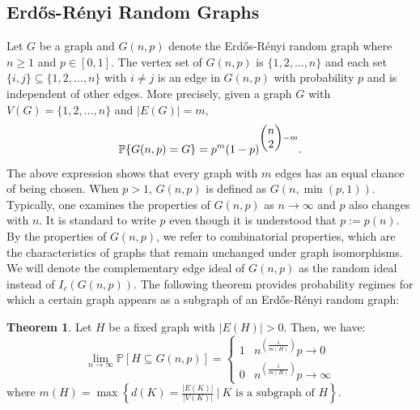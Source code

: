 \documentclass[oneside, 12pt]{amsart} \topmargin      -10mm \textwidth      160 true mm
\theoremstyle{definition}
\newtheorem{theorem'}{Theorem}[subsection]
\numberwithin{equation}{section}
\begin{document}
\subsection{Erd\H{o}s-Rényi Random Graphs}
Let $ G $ be a graph and $ G(n, p) $ denote the Erd\H{o}s-Rényi random graph where $ n\geq 1 $ and $ p\in [0, 1] $. The vertex set of $ G(n, p) $ is $ \{1,2,\dots , n\} $ and each set $ \{i, j\}\subseteq \{1,2,\dots,n\} $ with $ i\neq j $ is an edge in $ G(n, p) $ with probability $ p $ and is independent of other edges. More precisely, given a graph $ G $ with $V(G)= \{1,2,\dots,n\}$ and $|E(G)|= m $,
$$ \mathbb{P}\{G(n, p)=G\}=p^m(1-p)^{\begin{pmatrix}n\cr 2\end{pmatrix}-m}. $$
The above expression shows that every graph with $ m $ edges has an equal chance of being chosen. When $ p>1 $, $ G(n, p) $ is defined as $ G(n, \min(p, 1)) $. Typically, one examines the properties of $ G(n, p) $ as $ n \to \infty $ and $ p $ also changes with $ n $. It is standard to write $ p $ even though it is understood that $ p:=p(n) $. By the properties of $ G(n, p) $, we refer to combinatorial properties, which are the characteristics of graphs that remain unchanged under graph isomorphisms.  We will denote the complementary edge ideal  of $ G(n, p)$ as the random ideal instead of $I_c(G(n,p))$.
The following theorem provides probability regimes for which a  certain graph appears as a subgraph of an Erd\H{o}s-Rényi random graph:
\begin{theorem'}\cite[Theorem~5.3.]{frieze2015introduction}\label{prob}
  Let $H$ be a fixed graph with $|E(H)|>0$. Then, we have: $$\displaystyle\lim_{{n \rightarrow \infty}}\mathbb{P}[H \subseteq G(n,p)]= \begin{cases} 
      1 & n^{(\frac{1}{m(H)})}p \rightarrow 0 \\
      0 & n^{(\frac{1}{m(H)})}p  \rightarrow \infty 
   \end{cases}
$$  where $m(H)=\max\left\{d(K)=\frac{|E(K)|}{|V(K)|} \ | \ K \text{ is a subgraph of $H$} \right\}$. 
\end{theorem'}
\end{document}
